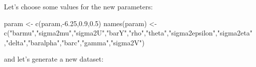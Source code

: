 \documentclass[
]{book}
\newenvironment{Shaded}{\begin{snugshade}}{\end{snugshade}}
\newcommand{\FloatTok}[1]{\textcolor[rgb]{0.00,0.00,0.81}{#1}}
\newcommand{\FunctionTok}[1]{\textcolor[rgb]{0.00,0.00,0.00}{#1}}
\newcommand{\NormalTok}[1]{#1}
\newcommand{\OtherTok}[1]{\textcolor[rgb]{0.56,0.35,0.01}{#1}}
\newcommand{\SpecialCharTok}[1]{\textcolor[rgb]{0.00,0.00,0.00}{#1}}
\newcommand{\StringTok}[1]{\textcolor[rgb]{0.31,0.60,0.02}{#1}}
\theoremstyle{definition}
\theoremstyle{definition}
\theoremstyle{definition}
\theoremstyle{definition}
\theoremstyle{remark}
\begin{document}
Let's choose some values for the new parameters:

\begin{Shaded}
\begin{Highlighting}[]
\NormalTok{param }\OtherTok{\textless{}{-}} \FunctionTok{c}\NormalTok{(param,}\SpecialCharTok{{-}}\FloatTok{6.25}\NormalTok{,}\FloatTok{0.9}\NormalTok{,}\FloatTok{0.5}\NormalTok{)}
\FunctionTok{names}\NormalTok{(param) }\OtherTok{\textless{}{-}} \FunctionTok{c}\NormalTok{(}\StringTok{"barmu"}\NormalTok{,}\StringTok{"sigma2mu"}\NormalTok{,}\StringTok{"sigma2U"}\NormalTok{,}\StringTok{"barY"}\NormalTok{,}\StringTok{"rho"}\NormalTok{,}\StringTok{"theta"}\NormalTok{,}\StringTok{"sigma2epsilon"}\NormalTok{,}\StringTok{"sigma2eta"}\NormalTok{,}\StringTok{"delta"}\NormalTok{,}\StringTok{"baralpha"}\NormalTok{,}\StringTok{"barc"}\NormalTok{,}\StringTok{"gamma"}\NormalTok{,}\StringTok{"sigma2V"}\NormalTok{)}
\end{Highlighting}
\end{Shaded}

and let's generate a new dataset:
\end{document}
